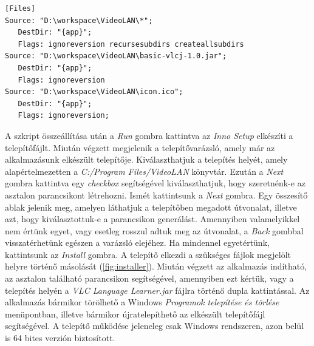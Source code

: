 \begin{lstlisting}[caption=Telepítőhöz szükséges fájlok, label={lst:files}]
[Files]
Source: "D:\workspace\VideoLAN\*";
   DestDir: "{app}";
   Flags: ignoreversion recursesubdirs createallsubdirs
Source: "D:\workspace\VideoLAN\basic-vlcj-1.0.jar";
   DestDir: "{app}";
   Flags: ignoreversion
Source: "D:\workspace\VideoLAN\icon.ico";
   DestDir: "{app}";
   Flags: ignoreversion;
\end{lstlisting}

A szkript összeállítása után a \textit{Run} gombra kattintva az \textit{Inno Setup} elkészíti a telepítőfájlt. Miután végzett megjelenik a telepítővarázsló, amely már az alkalmazásunk elkészült telepítője. Kiválaszthatjuk a telepítés helyét, amely alapértelmezetten a \textit{C:/Program Files/VideoLAN} könyvtár. Ezután a \textit{Next} gombra kattintva egy \textit{checkbox} segítségével kiválaszthatjuk, hogy szeretnénk-e az asztalon parancsikont létrehozni. Ismét kattintsunk a \textit{Next} gombra. Egy összesítő ablak jelenik meg, amelyen láthatjuk a telepítőben megadott útvonalat, illetve azt, hogy kiválasztottuk-e a parancsikon generálást. Amennyiben valamelyikkel nem értünk egyet, vagy esetleg rosszul adtuk meg az útvonalat, a \textit{Back} gombbal visszatérhetünk egészen a varázsló elejéhez. Ha mindennel egyetértünk, kattintsunk az \textit{Install} gombra. A telepítő elkezdi a szükséges fájlok megjelölt helyre történő másolását (\ref{fig:installer}). Miután végzett az alkalmazás indítható, az asztalon található parancsikon segítségével, amennyiben ezt kértük, vagy a telepítés helyén a \textit{VLC Language Learner.jar} fájlra történő dupla kattintással. Az alkalmazás bármikor törölhető a Windows \textit{Programok telepítése és törlése} menüpontban, illetve bármikor újratelepíthető az elkészült telepítőfájl segítségével. A telepítő működése jeleneleg csak Windows rendszeren, azon belül is 64 bites verzión biztosított.